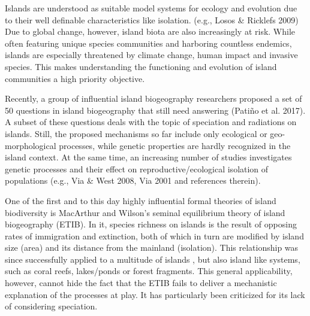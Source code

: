 \documentclass[a4paper]{scrartcl}
\begin{document}



Islands are understood as suitable model systems for ecology and evolution due to their well definable characteristics like isolation. (e.g., Losos & Ricklefs 2009) %
Due to global change, however, island biota are also increasingly at risk.
While often featuring unique species communities and harboring countless endemics, %
islands are especially threatened by climate change, human impact and invasive species. %
This makes understanding the functioning and evolution of island communities a high priority objective.

Recently, a group of influential island biogeography researchers proposed a set of 50 questions in island biogeography that still need answering (Patiño et al. 2017).
A subset of these questions deals with the topic of speciation and radiations on islands.
Still, the proposed mechanisms so far include only ecological or geo-morphological processes,
while genetic properties are hardly recognized in the island context.
At the same time, an increasing number of studies investigates genetic processes and
their effect on reproductive/ecological isolation of populations (e.g., Via & West 2008, Via 2001 and references therein).

One of the first and to this day highly influential formal theories of island biodiversity is MacArthur and Wilson's seminal equilibrium theory of island biogeography (ETIB). %
In it, species richness on islands is the result of opposing rates of immigration and extinction, both of which in turn are modified by island size (area) and its distance from the mainland (isolation).
This relationship was since successfully applied to a multitude of islands %
, but also island like systems, such as coral reefs, lakes/ponds or forest fragments. %
This general applicability, however, cannot hide the fact that the ETIB fails to deliver a mechanistic explanation of the processes at play.
It has particularly been criticized for its lack of considering speciation. %
\end{document}
